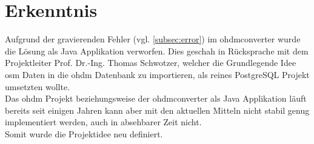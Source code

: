 \newpage
\section{Erkenntnis}
Aufgrund der gravierenden Fehler (vgl. \autoref{subsec:error}) im \gls{ohdmconverter} wurde die Lösung als Java Applikation verworfen. Dies geschah in Rücksprache mit dem Projektleiter Prof. Dr.-Ing. Thomas Schwotzer, welcher die Grundlegende Idee \gls{osm} Daten in die \gls{ohdm} Datenbank zu importieren, als reines PostgreSQL Projekt umsetzten wollte.\\
Das \gls{ohdm} Projekt beziehungsweise der \gls{ohdmconverter} als Java Applikation läuft bereits seit einigen Jahren kann aber mit den aktuellen Mitteln nicht stabil genug implementiert werden, auch in absehbarer Zeit nicht.\\

Somit wurde die Projektidee neu definiert.